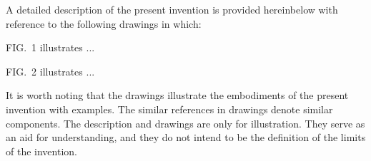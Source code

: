 



A detailed description of the present invention is provided hereinbelow with reference to the following drawings in which:

FIG.~1 illustrates 
	...




FIG.~2 illustrates
	...








It is worth noting that the drawings illustrate the embodiments of the present invention with examples. The similar references in drawings denote similar components. The description and drawings are only for illustration. They serve as an aid for understanding, and they do not intend to be the definition of the limits of the invention.




